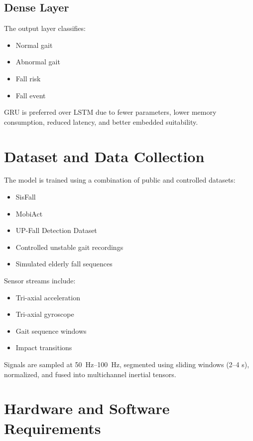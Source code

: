 \documentclass[conference]{IEEEtran}
\begin{document}
\subsection{Dense Layer}
The output layer classifies:
\begin{itemize}[leftmargin=*]
\item Normal gait
\item Abnormal gait
\item Fall risk
\item Fall event
\end{itemize}

GRU is preferred over LSTM due to fewer parameters, lower memory consumption, reduced latency, and better embedded suitability.

\section{Dataset and Data Collection}
The model is trained using a combination of public and controlled datasets:
\begin{itemize}[leftmargin=*]
\item SisFall
\item MobiAct
\item UP-Fall Detection Dataset
\item Controlled unstable gait recordings
\item Simulated elderly fall sequences
\end{itemize}

Sensor streams include:
\begin{itemize}[leftmargin=*]
\item Tri-axial acceleration
\item Tri-axial gyroscope
\item Gait sequence windows
\item Impact transitions
\end{itemize}

Signals are sampled at \SI{50}{Hz}--\SI{100}{Hz}, segmented using sliding windows (2--4 s), normalized, and fused into multichannel inertial tensors.

\section{Hardware and Software Requirements}
\end{document}
